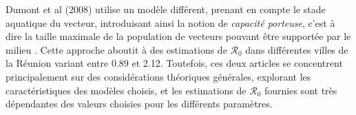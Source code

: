 Dumont et al (2008) utilise un modèle différent, prenant en compte le stade aquatique du vecteur, introduisant ainsi la notion de {\em capacité porteuse}, c'est à dire la taille maximale de la population de vecteurs pouvant être supportée par le milieu \cite{dumont2008temporal}.
Cette approche aboutit à des estimations de $\mathcal{R}_0$ dans différentes villes de la Réunion variant entre  0.89 et 2.12.
Toutefois, ces deux articles se concentrent principalement sur des considérations théoriques générales, explorant les caractéristiques des modèles choisis, et les estimations de $\mathcal{R}_0$ fournies sont très dépendantes des valeurs choisies pour les différents paramètres. 

